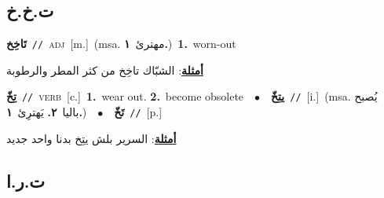 \documentclass[10pt,a4paper,twoside]{article} %
\begin{document}
\begin{multicols}{2}
{{{\vspace{-3mm}
\subsection*{\color{blue}\foreignlanguage{arabic}{ت.خ.خ}\color{blue}{}} 

{\setlength\topsep{0pt}\textbf{\foreignlanguage{arabic}{تَاخِخ}}\ {\color{gray}\texttt{//}\color{black}}\ \textsc{adj}\ [m.]\ \color{gray}(msa. \foreignlanguage{arabic}{مهترئ}~\foreignlanguage{arabic}{\textbf{١.}})\color{black}\ \textbf{1.}~worn-out\  \begin{flushright}\color{gray}\foreignlanguage{arabic}{\textbf{\underline{\foreignlanguage{arabic}{أمثلة}}}: الشبّاك تاخِخ من كثر المطر والرطوبة}\end{flushright}\color{black}} \vspace{2mm}

{\setlength\topsep{0pt}\textbf{\foreignlanguage{arabic}{تِخّ}}\ {\color{gray}\texttt{//}\color{black}}\ \textsc{verb}\ [c.]\ \textbf{1.}~wear out.  \textbf{2.}~become obsolete\ \ $\bullet$\ \ \setlength\topsep{0pt}\textbf{\foreignlanguage{arabic}{يتِخّ}}\ {\color{gray}\texttt{//}\color{black}}\ [i.]\ \color{gray}(msa. \foreignlanguage{arabic}{يُصبح باليا}~\foreignlanguage{arabic}{\textbf{٢.}}  \foreignlanguage{arabic}{يَهترِئ}~\foreignlanguage{arabic}{\textbf{١.}})\color{black}\ \ $\bullet$\ \ \setlength\topsep{0pt}\textbf{\foreignlanguage{arabic}{تَخّ}}\ {\color{gray}\texttt{//}\color{black}}\ [p.]\  \begin{flushright}\color{gray}\foreignlanguage{arabic}{\textbf{\underline{\foreignlanguage{arabic}{أمثلة}}}: السرير بلش يتِخ بدنا واحد جديد}\end{flushright}\color{black}} \vspace{2mm}

\vspace{-3mm}
\subsection*{\color{blue}\foreignlanguage{arabic}{ت.ر.ا}\color{blue}{ (ntws)}} 

}}}
\end{multicols}
\end{document}
